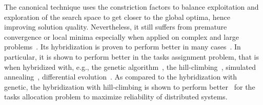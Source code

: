 The canonical \pso{} technique uses the constriction factors to balance exploitation and exploration of the search space to get closer to the global optima, hence improving solution quality. Nevertheless, it still suffers from premature convergence or local minima especially when applied on complex and large problems~\cite{Rini2011ParticleChallenges}. Its hybridization is proven to perform better in many cases~\cite{Sengupta2018ParticlePerspectives}. In particular, it is shown to perform better in the tasks assignment problem, that is when hybridized with, e.g., the genetic algorithm~\cite{Sailer2013OptimizingAUTOSAR}, the hill-climbing~\cite{yin2007task}, simulated annealing~\cite{Zhao2007ASystem}, differential evolution~\cite{Storn1997DifferentialSpaces}. As compared to the hybridization with genetic, the hybridization with hill-climbing \hcpso{} is shown to perform better~\cite{yin2007task} for the tasks allocation problem to maximize reliability of distributed systems. 

